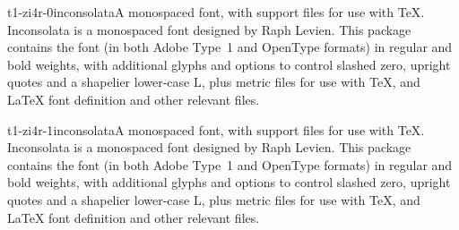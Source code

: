 \documentclass{ddltxtyp}
\begin{document}
\begin{package}{t1-zi4r-0}{inconsolata}{A monospaced font, with support files for use with {\TeX}.}
Inconsolata is a monospaced font designed by Raph Levien. This
package contains the font (in both Adobe Type~1 and OpenType
formats) in regular and bold weights, with additional glyphs
and options to control slashed zero, upright quotes and a
shapelier lower-case L, plus metric files for use with {\TeX}, and
{\LaTeX} font definition and other relevant files.
\end{package}
\begin{package}{t1-zi4r-1}{inconsolata}{A monospaced font, with support files for use with {\TeX}.}
Inconsolata is a monospaced font designed by Raph Levien. This
package contains the font (in both Adobe Type~1 and OpenType
formats) in regular and bold weights, with additional glyphs
and options to control slashed zero, upright quotes and a
shapelier lower-case L, plus metric files for use with {\TeX}, and
{\LaTeX} font definition and other relevant files.
\end{package}
\end{document}
